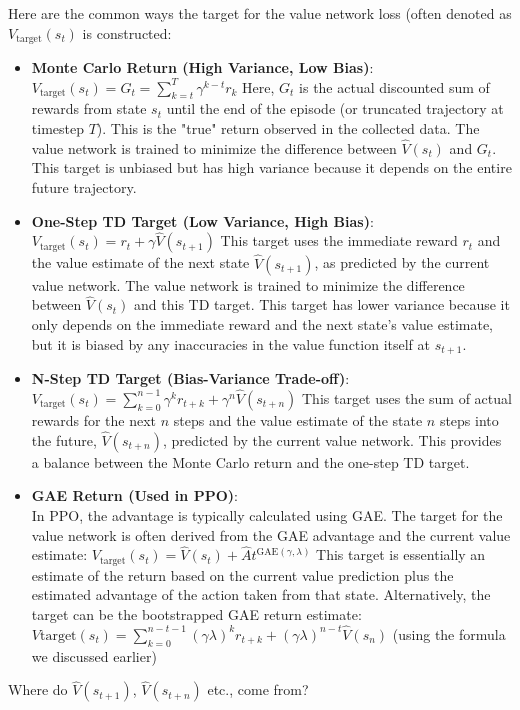 \documentclass[10pt,a4paper]{report}
\begin{document}
Here are the common ways the target for the value network loss (often denoted as $V_{\text{target}}(s_t)$ is constructed:

\begin{itemize}
\item    \textbf{Monte Carlo Return (High Variance, Low Bias)}:\\ $V_{\text{target}}(s_t) = G_t = \sum_{k=t}^T \gamma^{k-t} r_k$ Here, $G_t$ is the actual discounted sum of rewards from state $s_t$ until the end of the episode (or truncated trajectory at timestep $T$). This is the "true" return observed in the collected data. The value network is trained to minimize the difference between $\hat{V}(s_t)$ and $G_t$. This target is unbiased but has high variance because it depends on the entire future trajectory.

\item    \textbf{One-Step TD Target (Low Variance, High Bias)}:\\ $V_{\text{target}}(s_t) = r_t + \gamma \hat{V}(s_{t+1})$ This target uses the immediate reward $r_t$ and the value estimate of the next state $\hat{V}(s_{t+1})$, as predicted by the current value network. The value network is trained to minimize the difference between $\hat{V}(s_t)$ and this TD target. This target has lower variance because it only depends on the immediate reward and the next state's value estimate, but it is biased by any inaccuracies in the value function itself at $s_{t+1}$.

\item    \textbf{N-Step TD Target (Bias-Variance Trade-off)}:\\
 $V_{\text{target}}(s_t) = \sum_{k=0}^{n-1} \gamma^k r_{t+k} + \gamma^n \hat{V}(s_{t+n})$ This target uses the sum of actual rewards for the next $n$ steps and the value estimate of the state $n$ steps into the future, $\hat{V}(s_{t+n})$, predicted by the current value network. This provides a balance between the Monte Carlo return and the one-step TD target.

\item   \textbf{GAE Return (Used in PPO)}:\\ In PPO, the advantage is typically calculated using GAE. The target for the value network is often derived from the GAE advantage and the current value estimate: $V_{\text{target}}(s_t) = \hat{V}(s_t) + \hat{A}t^{\text{GAE}(\gamma, \lambda)}$ This target is essentially an estimate of the return based on the current value prediction plus the estimated advantage of the action taken from that state. Alternatively, the target can be the bootstrapped GAE return estimate: $V{\text{target}}(s_t) = \sum_{k=0}^{n-t-1} (\gamma\lambda)^k r_{t+k} + (\gamma\lambda)^{n-t} \hat{V}(s_n)$ (using the formula we discussed earlier)
\end{itemize}
\newpage
Where do $\hat{V}(s_{t+1})$, $\hat{V}(s_{t+n})$ etc., come from?
\end{document}

